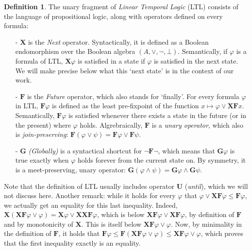 \documentclass[11pt]{article}
\newcommand{\X}{{\mathbf{X}}}
\newcommand{\F}{{\mathbf{F}}}
\newcommand{\orr}{{\vee}}
\newcommand{\andd}{{\wedge}}
\newcommand{\phii}{{\varphi}}
\newcommand{\G}{{\mathbf{G}}}
\theoremstyle{definition}
\newtheorem{definition}{Definition}
\begin{document}
\begin{definition}\label{LTL}
    The unary fragment of \emph{Linear Temporal Logic} (LTL) 
    consists of the language of propositional logic, along with
    operators defined on every formula:
    \begin{itemize}
        \item[-] $\X$ is the \emph{Next} operator. Syntactically, it is defined as a Boolean 
            endomorphism over the Boolean algebra $(A,\orr,\neg,\bot)$. Semantically, if $\phii$ is 
            a formula of LTL, $\X\phii$ is 
            satisfied in a state if $\phii$ is satisfied in the next state. We will make precise below what this
            `next state' is in the context of our work.
        \item[-] $\F$ is the \emph{Future} operator, which also stands for `finally'.
            For every formula $\phii$ in LTL, $\F\phii$ is defined as the least pre-fixpoint of the
            function $x\mapsto \phii\orr\X\F x$. Semantically, $\F\phii$ is satisfied whenever there
            exists a state in the future (or in the present) where $\phii$ holds. Algrebraically,
            $\F$ is a \emph{unary operator}, which also is \emph{join-preserving}:
            $\F(\phii\orr\psi)=\F\phii\orr\F\psi$.
        \item[-]$\G$ \emph{(Globally)} is a syntactical shortcut for $\neg\F\neg$, which means that $\G\phii$ is true 
            exactly when
            $\phii$ holds forever from the current state on. By symmetry, it is a meet-preserving,
            unary operator: $\G(\phii\andd\psi)=\G\phii\andd\G\psi$.
    \end{itemize}
\end{definition}
Note that the definition of LTL usually includes operator $\mathbf{U}$ (\emph{until}), which we will not
discuss here.
Another remark: while it holds for every $\phii$ that $\phii\orr\X\F\phii\leq\F\phii$, we actually
get an equality for this last inequality. Indeed, $\X(\X\F\phii\orr\phii)=\X\phii\orr\X\X\F\phii$,
which is below $\X\F\phii\orr\X\F\phii$, by definition of $\F$ and by monotonicity of $\X$. This
is itself below $\X\F\phii\orr\phii$. Now, by minimality in the definition of $\F$, it holds that
$\F\phii\leq\F(\X\F\phii\orr\phii)\leq\X\F\phii\orr\phii$, which proves that the first inequality
exactly is an equality.
\end{document}
